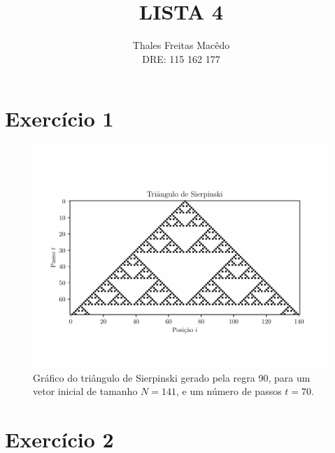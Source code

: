 \documentclass[a4paper, brazil]{article}
\author{Thales Freitas Macêdo \\ DRE: 115 162 177}
\title{LISTA 4}
\begin{document}
\maketitle

\section{Exercício 1}

\begin{figure}[ht]
\centering
\includegraphics[width=\textwidth]{fig_1.pdf}
\caption{Gráfico do triângulo de Sierpinski gerado pela regra 90, para um vetor inicial de tamanho \( N = 141 \), e um número de passos \( t = 70 \).}\label{fig1}
\end{figure}


\newpage
\section{Exercício 2}
\end{document}
